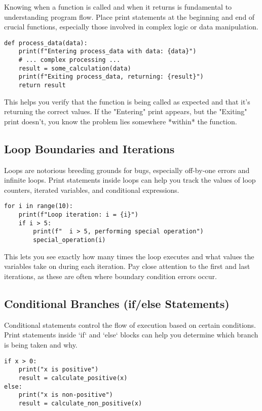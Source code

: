 \documentclass{article}
\begin{document}
Knowing when a function is called and when it returns is fundamental to understanding program flow. Place print statements at the beginning and end of crucial functions, especially those involved in complex logic or data manipulation.

\begin{verbatim}
def process_data(data):
    print(f"Entering process_data with data: {data}")
    # ... complex processing ...
    result = some_calculation(data)
    print(f"Exiting process_data, returning: {result}")
    return result
\end{verbatim}

This helps you verify that the function is being called as expected and that it's returning the correct values.  If the "Entering" print appears, but the "Exiting" print doesn't, you know the problem lies somewhere *within* the function.

\subsection*{Loop Boundaries and Iterations}

Loops are notorious breeding grounds for bugs, especially off-by-one errors and infinite loops. Print statements inside loops can help you track the values of loop counters, iterated variables, and conditional expressions.

\begin{verbatim}
for i in range(10):
    print(f"Loop iteration: i = {i}")
    if i > 5:
        print(f"  i > 5, performing special operation")
        special_operation(i)
\end{verbatim}

This lets you see exactly how many times the loop executes and what values the variables take on during each iteration. Pay close attention to the first and last iterations, as these are often where boundary condition errors occur.

\subsection*{Conditional Branches (if/else Statements)}

Conditional statements control the flow of execution based on certain conditions. Print statements inside `if` and `else` blocks can help you determine which branch is being taken and why.

\begin{verbatim}
if x > 0:
    print("x is positive")
    result = calculate_positive(x)
else:
    print("x is non-positive")
    result = calculate_non_positive(x)
\end{verbatim}
\end{document}
